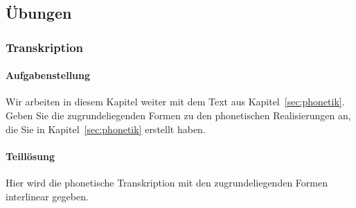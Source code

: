 \subsection{Übungen}

\subsubsection{Transkription}

\paragraph*{Aufgabenstellung}

Wir arbeiten in diesem Kapitel weiter mit dem Text aus Kapitel~\ref{sec:phonetik}.
Geben Sie die zugrundeliegenden Formen zu den phonetischen Realisierungen an, die Sie in Kapitel~\ref{sec:phonetik} erstellt haben.

\paragraph*{Teillösung}

Hier wird die phonetische Transkription mit den zugrundeliegenden Formen interlinear gegeben.

